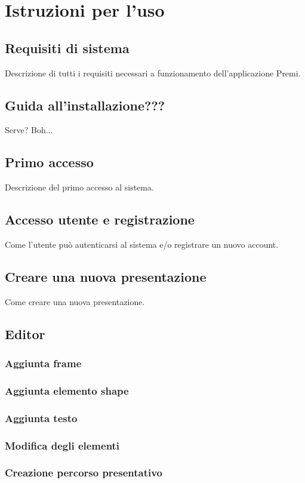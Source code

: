 \section{Istruzioni per l'uso}
\subsection{Requisiti di sistema}
Descrizione di tutti i requisiti necessari a funzionamento dell'applicazione Premi.

\subsection{Guida all'installazione???}
Serve? Boh...

\subsection{Primo accesso}
Descrizione del primo accesso al sistema.

\subsection{Accesso utente e registrazione}
Come l'utente può autenticarsi al sistema e/o registrare un nuovo account.

\subsection{Creare una nuova presentazione}
Come creare una nuova presentazione.

\subsection{Editor}
\subsubsection{Aggiunta frame}
\subsubsection{Aggiunta elemento shape}
\subsubsection{Aggiunta testo}
\subsubsection{Modifica degli elementi}
\subsubsection{Creazione percorso presentativo}
